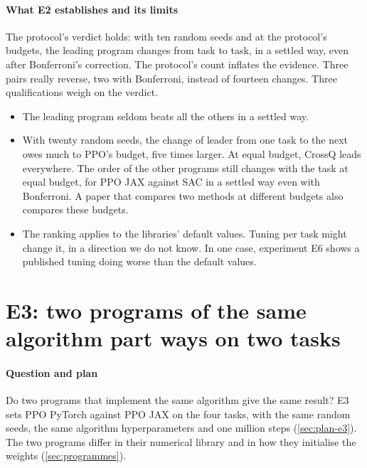 \paragraph{What E2 establishes and its limits}
The protocol's verdict holds: with ten random seeds and at the protocol's budgets, the leading program
changes from task to task, in a settled way, even after Bonferroni's correction. The protocol's count
inflates the evidence. Three pairs really reverse, two with Bonferroni, instead of fourteen changes. Three
qualifications weigh on the verdict.
\begin{itemize}
  \item The leading program seldom beats all the others in a settled way.
  \item With twenty random seeds, the change of leader from one task to the next owes much to PPO's budget,
    five times larger. At equal budget, CrossQ leads everywhere. The order of the other programs still changes
    with the task at equal budget, for PPO JAX against SAC in a settled way even with Bonferroni. A paper that
    compares two methods at different budgets also compares these budgets.
  \item The ranking applies to the libraries' default values. Tuning per task might change it, in a direction
    we do not know. In one case, experiment E6 shows a published tuning doing worse than the default values.
\end{itemize}

\section{E3: two programs of the same algorithm part ways on two tasks}\label{sec:e3}

\paragraph{Question and plan}
Do two programs that implement the same algorithm give the same result? E3 sets PPO PyTorch against PPO JAX on
the four tasks, with the same random seeds, the same algorithm hyperparameters and one million steps
(\cref{sec:plan-e3}). The two programs differ in their numerical library and in how they initialise the
weights (\cref{sec:programmes}).

